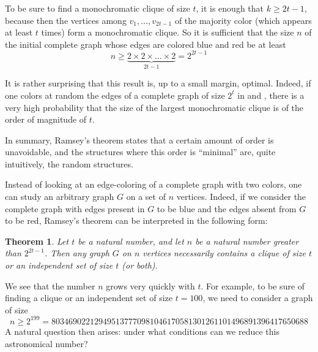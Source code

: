 \documentclass{amsart}
\newtheorem*{theorem}{Theorem}
\begin{document}
To be sure to find a monochromatic clique of size $t$, it is enough
that $k \ge 2t - 1$, because then the vertices among
$v_1, \ldots, v_{2t-1}$ of the majority color (which appears at least
$t$ times) form a monochromatic clique. So it is sufficient that the
size $n$ of the initial complete graph whose edges are colored blue
and red be at least
\[
n\geq \underbrace{2\times2\times\dots\times2}_{2t-1}=2^{2t-1}
\]

It is rather surprising that this result is, up to a small margin,
optimal. Indeed, if one colors at random%
the edges of a complete graph of
size $2^{t}$ in  and , there is a very high
probability%
that the size of the largest monochromatic clique is of the order
of magnitude of $t$.%


In summary, Ramsey’s theorem states that a certain amount of order is
unavoidable, and the structures where this order is ``minimal'' are,
quite intuitively,%
the random structures.

Instead of looking at an edge-coloring of a complete graph with two
colors, one can study an arbitrary graph $G$ on a set of $n$
vertices. Indeed, if we consider the complete graph with edges present
in $G$ to be blue and the edges absent from $G$ to be red, Ramsey’s
theorem can be interpreted in the following form:
\begin{theorem}
  Let $t$ be a natural number, and let $n$ be a natural number greater
  than $2^{2t-1}$.  Then any graph $G$ on $n$ vertices necessarily
  contains a clique of size $t$ or an independent set of size $t$ (or
  both).
\end{theorem}
We see that the number $n$ grows very quickly with $t$. For example,
to be sure of finding a clique or an independent set of size $t=100$,
we need to consider a graph of size
\[
n\geq 2^{199}=803469022129495137770981046170581301261101496891396417650688
\]
A natural question then arises: under what conditions can we reduce
this astronomical number?
\end{document}
